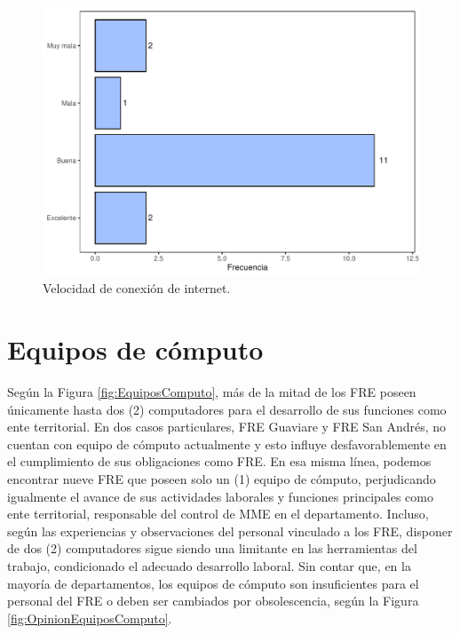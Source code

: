 \documentclass[
]{book}
\begin{document}
\begin{figure}

{\centering \includegraphics[width=0.85\linewidth]{InformeFinal_files/figure-latex/ConexionInternet-1} 

}

\caption{Velocidad de conexión de internet.}\label{fig:ConexionInternet}
\end{figure}

\hypertarget{equipos-de-cuxf3mputo}{%
\section{Equipos de cómputo}\label{equipos-de-cuxf3mputo}}

Según la Figura \ref{fig:EquiposComputo}, más de la mitad de los FRE poseen únicamente hasta dos (2) computadores para el desarrollo de sus funciones como ente territorial. En dos casos particulares, FRE Guaviare y FRE San Andrés, no cuentan con equipo de cómputo actualmente y esto influye desfavorablemente en el cumplimiento de sus obligaciones como FRE. En esa misma línea, podemos encontrar nueve FRE que poseen solo un (1) equipo de cómputo, perjudicando igualmente el avance de sus actividades laborales y funciones principales como ente territorial, responsable del control de MME en el departamento. Incluso, según las experiencias y observaciones del personal vinculado a los FRE, disponer de dos (2) computadores sigue siendo una limitante en las herramientas del trabajo, condicionado el adecuado desarrollo laboral. Sin contar que, en la mayoría de departamentos, los equipos de cómputo son insuficientes para el personal del FRE o deben ser cambiados por obsolescencia, según la Figura \ref{fig:OpinionEquiposComputo}.
\end{document}
